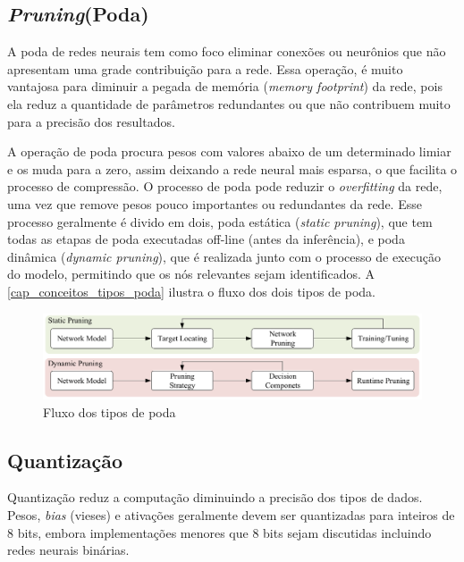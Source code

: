 \subsection{\textit{Pruning}(Poda)}\label{poda}

A poda de redes neurais tem como foco eliminar conexões ou neurônios que não apresentam uma grade contribuição para a
rede.
Essa operação, é muito vantajosa para diminuir a pegada de memória (\textit{memory footprint}) da rede, pois ela reduz
a quantidade de parâmetros redundantes ou que não contribuem muito para a precisão dos resultados.

A operação de poda procura pesos com valores abaixo de um determinado limiar e os muda para a zero, assim deixando
a rede neural mais esparsa, o que facilita o processo de compressão.
O processo de poda pode reduzir o \textit{overfitting} da rede, uma vez que remove pesos pouco importantes ou redundantes
da rede.
Esse processo geralmente é divido em dois, poda estática (\textit{static pruning}), que tem todas as etapas de poda
executadas off-line (antes da inferência), e poda dinâmica (\textit{dynamic pruning}), que é realizada junto com
o processo de execução do modelo, permitindo que os nós relevantes sejam identificados. A
\autoref{cap_conceitos_tipos_poda} ilustra o fluxo dos dois tipos de poda.

\begin{figure}[htb]
	\caption {\label{cap_conceitos_tipos_poda}Fluxo dos tipos de poda}
	\begin{center}
		\includegraphics[scale=0.5]{Imagens/categorias-poda}
	\end{center}
\end{figure}

\subsection{Quantização}\label{quantizacao}

Quantização reduz a computação diminuindo a precisão dos tipos de dados. Pesos, \textit{bias} (vieses) e ativações
geralmente devem ser quantizadas para inteiros de 8 bits, embora implementações menores que 8 bits sejam discutidas
incluindo redes neurais binárias. \cite{LIANG2021370}


